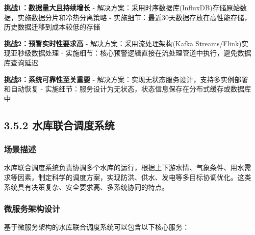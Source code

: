 \textbf{挑战1：数据量大且持续增长} -
解决方案：采用时序数据库(InfluxDB)存储原始数据，实施数据分片和冷热分离策略
- 实施细节：最近30天数据存放在高性能存储，历史数据迁移到成本较低的存储

\textbf{挑战2：预警实时性要求高} - 解决方案：采用流处理架构(Kafka
Streams/Flink)实现亚秒级数据处理 -
实施细节：核心预警逻辑直接在流处理管道中执行，避免数据库查询延迟

\textbf{挑战3：系统可靠性至关重要} -
解决方案：实现无状态服务设计，支持多实例部署和自动恢复 -
实施细节：服务设计为无状态，状态信息保存在分布式缓存或数据库中

\subsection{3.5.2
水库联合调度系统}\label{ux6c34ux5e93ux8054ux5408ux8c03ux5ea6ux7cfbux7edf}

\subsubsection{场景描述}\label{ux573aux666fux63cfux8ff0-1}

水库联合调度系统负责协调多个水库的运行，根据上下游水情、气象条件、用水需求等因素，制定科学的调度方案，实现防洪、供水、发电等多目标协调优化。这类系统具有决策复杂、安全要求高、多系统协同的特点。

\subsubsection{微服务架构设计}\label{ux5faeux670dux52a1ux67b6ux6784ux8bbeux8ba1-1}

基于微服务架构的水库联合调度系统可以包含以下核心服务：


